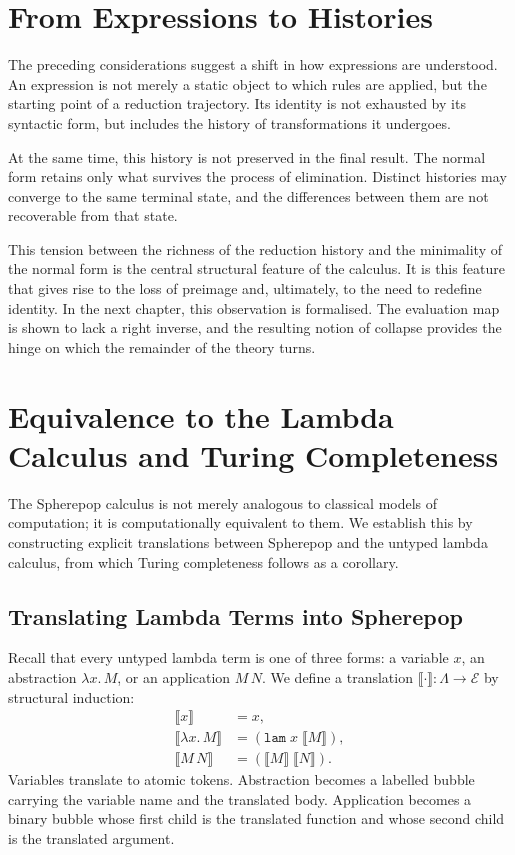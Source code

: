 \documentclass[12pt, oneside]{amsbook}
\theoremstyle{plain}
\theoremstyle{definition}
\theoremstyle{remark}
\newcommand{\Expr}{\mathcal{E}}
\begin{document}
\section{From Expressions to Histories}
\label{sec:sp:history}

The preceding considerations suggest a shift in how expressions are understood.
An expression is not merely a static object to which rules are applied, but the
starting point of a reduction trajectory. Its identity is not exhausted by its
syntactic form, but includes the history of transformations it undergoes.

At the same time, this history is not preserved in the final result. The normal
form retains only what survives the process of elimination. Distinct histories
may converge to the same terminal state, and the differences between them are
not recoverable from that state.

This tension between the richness of the reduction history and the minimality
of the normal form is the central structural feature of the calculus. It is
this feature that gives rise to the loss of preimage and, ultimately, to the
need to redefine identity. In the next chapter, this observation is formalised.
The evaluation map is shown to lack a right inverse, and the resulting notion
of collapse provides the hinge on which the remainder of the theory turns.


\section{Equivalence to the Lambda Calculus and Turing Completeness}
\label{sec:sp:lambda}

The Spherepop calculus is not merely analogous to classical models of
computation; it is computationally equivalent to them. We establish this by
constructing explicit translations between Spherepop and the untyped lambda
calculus, from which Turing completeness follows as a corollary.

\subsection{Translating Lambda Terms into Spherepop}

Recall that every untyped lambda term is one of three forms: a variable $x$,
an abstraction $\lambda x.\, M$, or an application $M\, N$. We define a
translation $\llbracket \cdot \rrbracket : \Lambda \to \Expr$ by structural
induction:
\begin{align*}
  \llbracket x \rrbracket
    &= x, \\
  \llbracket \lambda x.\, M \rrbracket
    &= (\mathtt{lam}\; x\; \llbracket M \rrbracket), \\
  \llbracket M\, N \rrbracket
    &= (\llbracket M \rrbracket\; \llbracket N \rrbracket).
\end{align*}
Variables translate to atomic tokens. Abstraction becomes a labelled bubble
carrying the variable name and the translated body. Application becomes a
binary bubble whose first child is the translated function and whose second
child is the translated argument.
\end{document}
